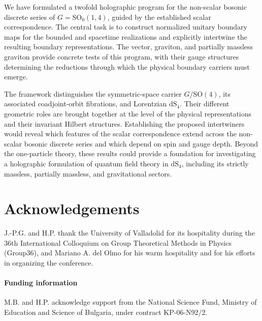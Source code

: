 \documentclass{SciPost}
\begin{document}
We have formulated a twofold holographic program for the non-scalar bosonic discrete series of $G=\mathrm{SO}_0(1,4)$, guided by the established scalar correspondence. The central task is to construct normalized unitary boundary maps for the bounded and spacetime realizations and explicitly intertwine the resulting boundary representations. The vector, graviton, and partially massless graviton provide concrete tests of this program, with their gauge structures determining the reductions through which the physical boundary carriers must emerge.

The framework distinguishes the symmetric-space carrier $G/\mathrm{SO}(4)$, its associated coadjoint-orbit fibrations, and Lorentzian $\mathrm{dS}_4$. Their different geometric roles are brought together at the level of the physical representations and their invariant Hilbert structures. Establishing the proposed intertwiners would reveal which features of the scalar correspondence extend across the non-scalar bosonic discrete series and which depend on spin and gauge depth. Beyond the one-particle theory, these results could provide a foundation for investigating a holographic formulation of quantum field theory in $\mathrm{dS}_4$, including its strictly massless, partially massless, and gravitational sectors.


\section*{Acknowledgements}

J.-P.G. and H.P. thank the University of Valladolid for its hospitality during the 36th International Colloquium on Group Theoretical Methods in Physics (Group36), and Mariano A. del Olmo for his warm hospitality and for his efforts in organizing the conference.


\paragraph{Funding information}

M.B. and H.P. acknowledge support from the National Science Fund, Ministry of Education and Science of Bulgaria, under contract KP-06-N92/2.



\end{document}
